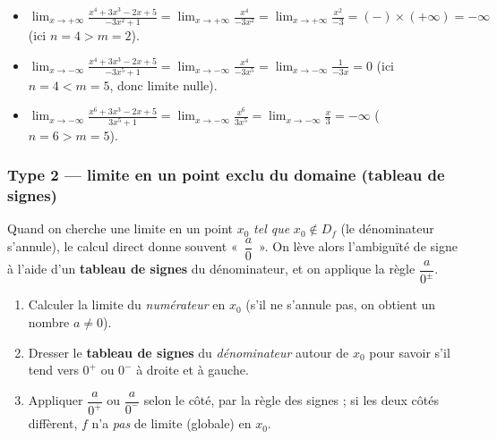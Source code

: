 \documentclass[11pt,a4paper]{article}
\begin{document}
\begin{exemple}[type 1 : $n>m$ et $n<m$]
\begin{itemize}[leftmargin=1.6em,topsep=2pt,itemsep=4pt]
  \item $\displaystyle\lim_{x\to+\infty}\frac{x^4+3x^3-2x+5}{-3x^2+1}
        =\lim_{x\to+\infty}\frac{x^4}{-3x^2}=\lim_{x\to+\infty}\frac{x^2}{-3}=(-)\times(+\infty)=-\infty$
        \quad (ici $n=4>m=2$).
  \item $\displaystyle\lim_{x\to-\infty}\frac{x^4+3x^3-2x+5}{-3x^5+1}
        =\lim_{x\to-\infty}\frac{x^4}{-3x^5}=\lim_{x\to-\infty}\frac{1}{-3x}=0$
        \quad (ici $n=4<m=5$, donc limite nulle).
  \item $\displaystyle\lim_{x\to-\infty}\frac{x^6+3x^3-2x+5}{3x^5+1}
        =\lim_{x\to-\infty}\frac{x^6}{3x^5}=\lim_{x\to-\infty}\frac{x}{3}=-\infty$
        \quad ($n=6>m=5$).
\end{itemize}
\end{exemple}

\subsubsection{Type 2 — limite en un point exclu du domaine (tableau de signes)}

Quand on cherche une limite en un point $x_0$ \emph{tel que} $x_0\notin D_f$ (le dénominateur
s'annule), le calcul direct donne souvent «~$\dfrac{a}{0}$~». On lève alors l'ambiguïté de signe à
l'aide d'un \textbf{tableau de signes} du dénominateur, et on applique la règle $\dfrac{a}{0^{\pm}}$.

\begin{methode}
\begin{enumerate}[leftmargin=1.9em,topsep=2pt,itemsep=2pt]
  \item Calculer la limite du \emph{numérateur} en $x_0$ (s'il ne s'annule pas, on obtient un nombre $a\neq 0$).
  \item Dresser le \textbf{tableau de signes} du \emph{dénominateur} autour de $x_0$ pour savoir s'il tend vers $0^{+}$ ou $0^{-}$ à droite et à gauche.
  \item Appliquer $\dfrac{a}{0^{+}}$ ou $\dfrac{a}{0^{-}}$ selon le côté, par la règle des signes ;
        si les deux côtés diffèrent, $f$ n'a \emph{pas} de limite (globale) en $x_0$.
\end{enumerate}
\end{methode}
\end{document}
